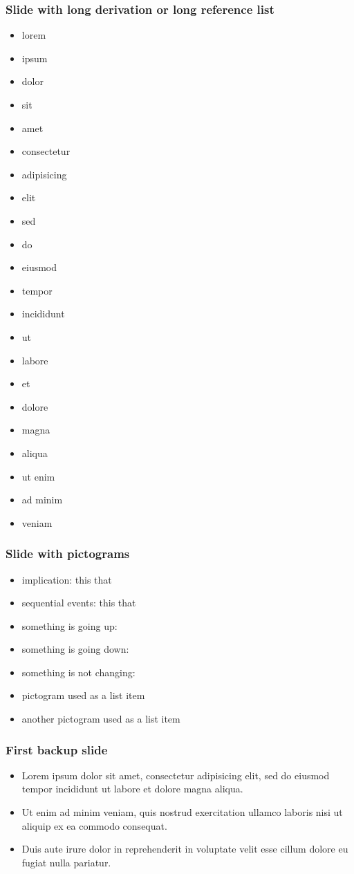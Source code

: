 \begin{frame}[allowframebreaks=0.8]
\frametitle{Slide with long derivation or long reference list}
\begin{itemize}
\item lorem 
\item ipsum 
\item dolor 
\item sit 
\item amet
\item consectetur 
\item adipisicing 
\item elit
\item sed
\item do
\item eiusmod
\item tempor
\item incididunt
\item ut
\item labore
\item et 
\item dolore 
\item magna 
\item aliqua
\item ut enim
\item ad minim 
\item veniam
\end{itemize}
\end{frame}

\begin{frame}
\frametitle{Slide with pictograms}
\begin{itemize}
\item implication: this \so that
\item sequential events: this \then that
\item something is going up: \up
\item something is going down: \down
\item something is not changing: \flat 
\item[\so] pictogram used as a list item
\item[\then] another pictogram used as a list item
\end{itemize}
\end{frame}

\lastslide

\begin{frame}[label=backupSlide]
\frametitle{First backup slide}
\begin{itemize}
\item Lorem ipsum dolor sit amet, consectetur adipisicing elit, sed do eiusmod
tempor incididunt ut labore et dolore magna aliqua.
\item  Ut enim ad minim veniam, quis nostrud exercitation ullamco laboris nisi ut aliquip ex ea commodo consequat. 
\item Duis aute irure dolor in reprehenderit in voluptate velit esse
cillum dolore eu fugiat nulla pariatur. 
\end{itemize}
\hyperlink{firstSlide}{}
\end{frame}

